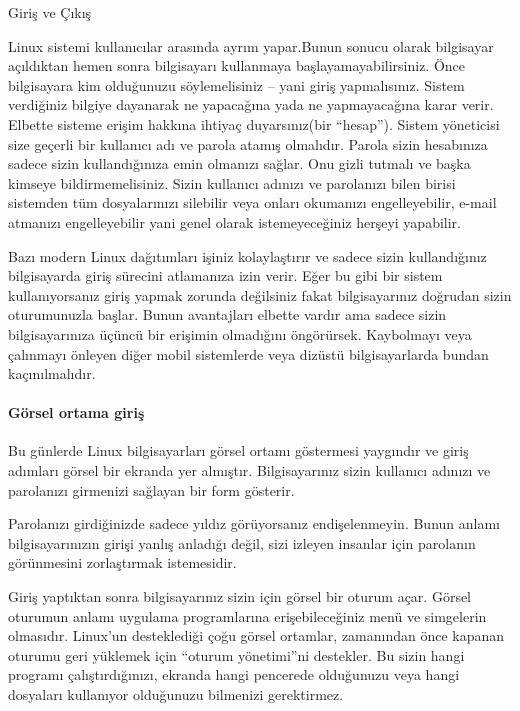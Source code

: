 \documentclass[10pt,a5paper]{book}
\begin{document}
\begin{section}{Giriş ve Çıkış}

Linux sistemi kullanıcılar arasında ayrım yapar.Bunun sonucu olarak bilgisayar açıldıktan hemen sonra bilgisayarı kullanmaya başlayamayabilirsiniz. Önce bilgisayara kim olduğunuzu söylemelisiniz – yani giriş yapmalısınız. Sistem verdiğiniz bilgiye dayanarak ne yapacağına yada ne yapmayacağına karar verir. Elbette sisteme erişim hakkına ihtiyaç duyarsınız(bir “hesap”). Sistem yöneticisi size geçerli bir kullanıcı adı ve parola atamış olmalıdır. Parola sizin hesabınıza sadece sizin kullandığınıza emin olmanızı sağlar. Onu gizli tutmalı ve başka kimseye bildirmemelisiniz. Sizin kullanıcı adınızı ve parolanızı bilen birisi sistemden tüm dosyalarınızı silebilir veya onları okumanızı engelleyebilir, e-mail atmanızı engelleyebilir yani genel olarak istemeyeceğiniz herşeyi yapabilir. 

Bazı modern Linux dağıtımları işiniz kolaylaştırır ve sadece sizin kullandığınız bilgisayarda giriş sürecini atlamanıza izin verir. Eğer bu gibi bir sistem kullanıyorsanız giriş yapmak zorunda değilsiniz fakat bilgisayarınız doğrudan sizin oturumunuzla başlar. Bunun avantajları elbette vardır ama sadece sizin bilgisayarınıza üçüncü bir erişimin olmadığını öngörürsek. Kaybolmayı veya çalınmayı önleyen diğer mobil sistemlerde veya dizüstü bilgisayarlarda bundan kaçınılmalıdır. 

\paragraph{ Görsel ortama giriş}{Bu günlerde Linux bilgisayarları görsel ortamı göstermesi yaygındır ve giriş adımları görsel bir ekranda yer almıştır. Bilgisayarınız sizin kullanıcı adınızı ve parolanızı girmenizi sağlayan bir form gösterir.}

Parolanızı girdiğinizde sadece yıldız görüyorsanız endişelenmeyin. Bunun anlamı bilgisayarınızın girişi yanlış anladığı değil, sizi izleyen insanlar için parolanın görünmesini zorlaştırmak istemesidir. 

Giriş yaptıktan sonra bilgisayarınız sizin için görsel bir oturum açar. Görsel oturumun anlamı uygulama programlarına erişebileceğiniz menü ve simgelerin olmasıdır. Linux’un desteklediği çoğu görsel ortamlar, zamanından önce kapanan oturumu geri yüklemek için “oturum yönetimi”ni destekler. Bu sizin hangi programı çalıştırdığınızı, ekranda hangi pencerede olduğunuzu veya hangi dosyaları kullanıyor olduğunuzu bilmenizi gerektirmez. 


\end{section}
\end{document}
